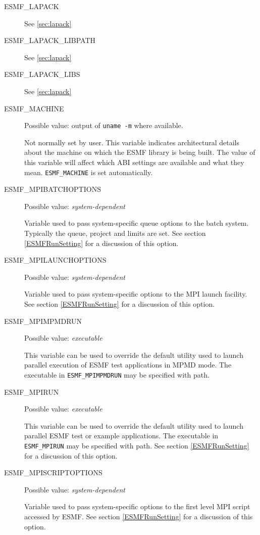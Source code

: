 \begin{description}
\item[ESMF\_LAPACK]
See \ref{sec:lapack}

\item[ESMF\_LAPACK\_LIBPATH]
See \ref{sec:lapack}

\item[ESMF\_LAPACK\_LIBS]
See \ref{sec:lapack}

\item[ESMF\_MACHINE]
Possible value: output of {\tt uname -m} where available.

Not normally set by user. This variable indicates architectural details about
the machine on which the ESMF library is being built. The value of this
variable will affect which ABI settings are available and what they mean.
{\tt ESMF\_MACHINE} is set automatically.

\item[ESMF\_MPIBATCHOPTIONS]
Possible value: {\em system-dependent}

Variable used to pass system-specific queue options to the batch system.
Typically the queue, project and limits are set.
See section \ref{ESMFRunSetting} for a discussion of this option.

\item[ESMF\_MPILAUNCHOPTIONS]
Possible value: {\em system-dependent}

Variable used to pass system-specific options to the MPI launch facility.
See section \ref{ESMFRunSetting} for a discussion of this option.

\item[ESMF\_MPIMPMDRUN]
Possible value: {\em executable}

This variable can be used to override the default utility used to launch
parallel execution of ESMF test applications in MPMD mode. The executable in
{\tt ESMF\_MPIMPMDRUN} may be specified with path.

\item[ESMF\_MPIRUN]
Possible value: {\em executable}

This variable can be used to override the default utility used to launch
parallel ESMF test or example applications. The executable in {\tt ESMF\_MPIRUN}
may be specified with path.
See section \ref{ESMFRunSetting} for a discussion of this option.

\item[ESMF\_MPISCRIPTOPTIONS]
Possible value: {\em system-dependent}

Variable used to pass system-specific options to the first level MPI script
accessed by ESMF.
See section \ref{ESMFRunSetting} for a discussion of this option.


\end{description}
